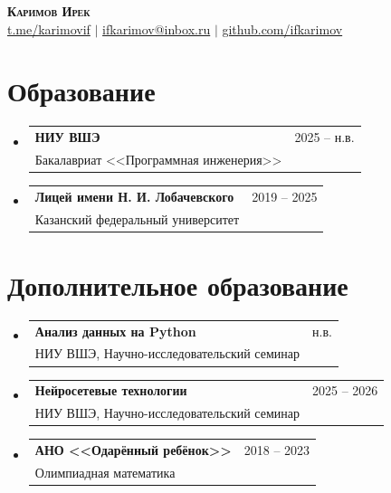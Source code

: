 \documentclass[a4paper,11pt]{article}
\makeatletter
\newcommand{\resumeSubheading}[3]{
  \vspace{-2pt}\item
    \begin{tabular*}{0.97\textwidth}[t]{l@{\extracolsep{\fill}}r}
      \textbf{#1} & #2 \\
      \small #3 & \\
    \end{tabular*}\vspace{-7pt}
}
\newcommand{\resumeSubHeadingListStart}{\begin{itemize}[leftmargin=0.15in, label={}]}
\newcommand{\resumeSubHeadingListEnd}{\end{itemize}}
\makeatother
\begin{document}

\begin{center}
    \textbf{\Huge \scshape Каримов Ирек} \\ \vspace{1pt}
    \href{https://t.me/karimovif}{t.me/karimovif} $|$
    \href{mailto:ifkarimov@inbox.ru}{ifkarimov@inbox.ru} $|$ 
    \href{https://github.com/ifkarimov}{github.com/ifkarimov}
\end{center}

% 

\section{Образование}
  \resumeSubHeadingListStart
    \resumeSubheading
      {НИУ ВШЭ}{2025 -- н.в.}
      {Бакалавриат <<Программная инженерия>>}
    \resumeSubheading
      {Лицей имени Н. И. Лобачевского}{2019 -- 2025}
      {Казанский федеральный университет}
  \resumeSubHeadingListEnd

\section{Дополнительное образование}
  \resumeSubHeadingListStart
      \resumeSubheading
      {Анализ данных на Python}{н.в.}
      {НИУ ВШЭ, Научно-исследовательский семинар}
    \resumeSubheading
      {Нейросетевые технологии}{2025 -- 2026}
      {НИУ ВШЭ, Научно-исследовательский семинар}
    \resumeSubheading
      {АНО <<Одарённый ребёнок>>}{2018 -- 2023}
      {Олимпиадная математика}
  \resumeSubHeadingListEnd
\end{document}
